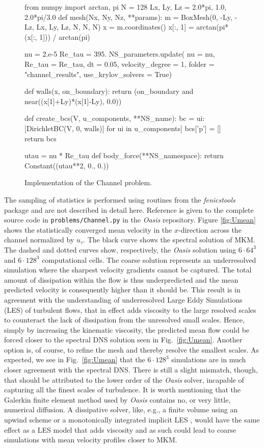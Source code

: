 \documentclass[final,3p,times,twocolumn]{elsarticle}
\newcommand{\inpyth}{\lstinline[style=inlinestyle]} %[]%
\newcounter{bla}
\begin{document}
\begin{figure}[t!]
\begin{python}[t!]
from numpy import arctan, pi
N = 128
Lx, Ly, Lz = 2.0*pi, 1.0, 2.0*pi/3.0
def mesh(Nx, Ny, Nz, **params):
    m = BoxMesh(0, -Ly, -Lz, Lx, Ly, Lz, 
                N, N, N)
    x = m.coordinates()
    x[:, 1] = arctan(pi*(x[:, 1])) / arctan(pi) 

nu = 2.e-5
Re_tau = 395.
NS_parameters.update(
  nu = nu,
  Re_tau = Re_tau,
  dt = 0.05,
  velocity_degree = 1,
  folder = "channel_results",
  use_krylov_solvers = True)

def walls(x, on_boundary):
    return (on_boundary and 
            near((x[1]+Ly)*(x[1]-Ly), 0.0))

def create_bcs(V, u_components, **NS_name):
    bc = {ui: [DirichletBC(V, 0, walls)] 
               for ui in u_components]}
    bcs['p'] = []    
    return bcs

utau = nu * Re_tau
def body_force(**NS_namespace):
    return Constant((utau**2, 0., 0.))
\end{python}
\caption{Implementation of the Channel problem.}
\label{fig:channel}
\end{figure}
The sampling of statistics is performed using routines from the  \emph{fenicstools} \cite{fenicstools} package and are not described in detail here. Reference is given to the complete source code in \inpyth{problems/Channel.py} in the \emph{Oasis} repository. Figure \ref{fig:Umean} shows the statistically converged mean velocity in the $x$-direction across the channel normalized by $u_{\tau}$. The black curve shows the spectral solution of MKM. The dashed and dotted curves show, respectively, the \emph{Oasis} solution using $6\cdot 64^3$ and $6\cdot 128^3$ computational cells. The coarse solution represents an underresolved simulation where the sharpest velocity gradients cannot be captured. The total amount of dissipation within the flow is thus underpredicted and the mean predicted velocity is consequently higher than it should be. This result is in agreement with the understanding of underresolved Large Eddy Simulations (LES) of turbulent flows, that in effect adds viscosity to the large resolved scales to counteract the lack of dissipation from the unresolved small scales. Hence, simply by increasing the kinematic viscosity, the predicted mean flow could be forced closer to the spectral DNS solution seen in Fig.~\ref{fig:Umean}. Another option is, of course, to refine the mesh and thereby resolve the smallest scales. As expected, we see in Fig.~\ref{fig:Umean} that the $6\cdot 128^3$ simulations are in much closer agreement with the spectral DNS. There is still a slight mismatch, though, that should be attributed to the lower order of the \emph{Oasis} solver, incapable of capturing all the finest scales of turbulence. It is worth mentioning that the Galerkin finite element method used by \emph{Oasis} contains no, or very little, numerical diffusion. A dissipative solver, like, e.g., a finite volume using an upwind scheme or a monotonically integrated implicit LES \cite{fureby99}, would have the same effect as a LES model that adds viscosity and as such could lead to coarse simulations with mean velocity profiles closer to MKM.
\end{document}
